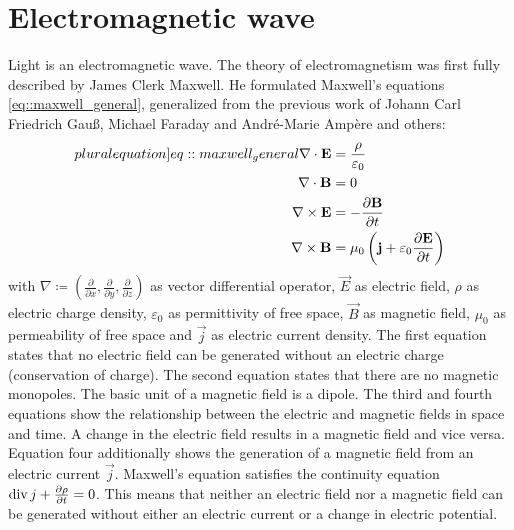 \section{Electromagnetic wave}
%
Light is an electromagnetic wave.
The theory of electromagnetism was first fully described by James Clerk Maxwell.
He formulated Maxwell's equations \cref{eq::maxwell_general}, generalized from the previous work of Johann Carl Friedrich Gau{\ss}, Michael Faraday and Andr\'{e}-Marie Amp\`{e}re and others:
%
\begin{align}
\begin{split} \label[pluralequation]{eq::maxwell_general}
    \nabla \cdot \vec{E} &= \frac {\rho} {\varepsilon_0}\\
    \nabla \cdot \vec{B} &= 0\\
    \nabla \times \vec{E} &= -\frac{\partial \vec{B}} {\partial t}\\
    \nabla \times \vec{B} &= \mu_0 \left( \vec{j} + \varepsilon_0 \frac{\partial \vec{E}} {\partial t} \right)
\end{split}
\end{align}
%
with $\nabla \coloneqq \left({\frac{\partial}{\partial x}}, {\frac{\partial}{\partial y}}, {\frac{\partial}{\partial z}} \right)$ as vector differential operator, $\vec{E}$ as electric field, $\rho$ as electric charge density, $\varepsilon_0$ as permittivity of free space, $\vec{B}$ as magnetic field, $\mu_0$ as permeability of free space and $\vec{j}$ as electric current density.
%
The first equation states that no electric field can be generated without an electric charge (conservation of charge).
The second equation states that there are no magnetic monopoles.
The basic unit of a magnetic field is a dipole.
The third and fourth equations show the relationship between the electric and magnetic fields in space and time.
A change in the electric field results in a magnetic field and vice versa.
Equation four additionally shows the generation of a magnetic field from an electric current $\vec{j}$.
Maxwell's equation satisfies the continuity equation $\operatorname{div} j + \frac{\partial \rho}{\partial t} = 0$.
This means that neither an electric field nor a magnetic field can be generated without either an electric current or a change in electric potential.
%
%

